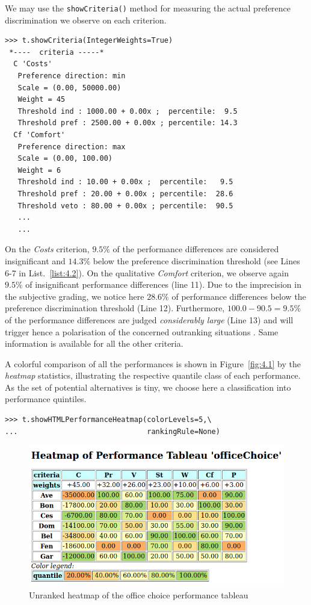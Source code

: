 We may use the \texttt{showCriteria()} method for measuring the actual preference discrimination we observe on each criterion.
\begin{lstlisting}[caption={Inspecting the performance criteria.},label=list:4.2]
>>> t.showCriteria(IntegerWeights=True)
 *----  criteria -----*
  C 'Costs'
   Preference direction: min
   Scale = (0.00, 50000.00)
   Weight = 45
   Threshold ind : 1000.00 + 0.00x ;  percentile:  9.5
   Threshold pref : 2500.00 + 0.00x ; percentile: 14.3
  Cf 'Comfort'
   Preference direction: max
   Scale = (0.00, 100.00)
   Weight = 6
   Threshold ind : 10.00 + 0.00x ;  percentile:   9.5
   Threshold pref : 20.00 + 0.00x ; percentile:  28.6
   Threshold veto : 80.00 + 0.00x ; percentile:  90.5
   ...
   ...
\end{lstlisting}

On the \emph{Costs} criterion, $9.5\%$ of the performance differences are considered insignificant and $14.3\%$ below the preference discrimination threshold (see Lines 6-7 in List.~\vref{list:4.2}). On the qualitative \emph{Comfort} criterion, we observe again $9.5\%$ of insignificant performance differences (line 11). Due to the imprecision in the subjective grading, we notice here $28.6\%$ of performance differences below the preference discrimination threshold (Line 12). Furthermore, $100.0 - 90.5 = 9.5\%$ of the performance differences are judged \emph{considerably large} (Line 13) and will trigger hence a polarisation of the concerned outranking situations \citep{BIS-2013}. Same information is available for all the other criteria. 
 
A colorful comparison of all the performances is shown in Figure~\vref{fig:4.1} by the \emph{heatmap} statistics, illustrating the respective quantile class of each performance. As the set of potential alternatives is tiny, we choose here a classification into performance quintiles.
\begin{lstlisting}
>>> t.showHTMLPerformanceHeatmap(colorLevels=5,\
...                              rankingRule=None)
\end{lstlisting}
    \begin{figure}[ht]
\includegraphics[width=\hsize]{Figures/4-1-officeChoiceHeatmap.png}
\caption{Unranked heatmap of the office choice performance tableau}
\label{fig:4.1}       %
\end{figure}

